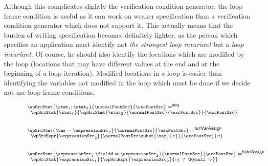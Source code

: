 Although this complicates slightly the verification condition generator, the loop frame condition is useful as it can work 
on weaker specification than a verification condition generator which does not support it. This actually means that the burden of writing specification 
becomes definitely lighter, as the person which specifies an application must identify not  \textit{the strongest loop invariant }
but a \textit{loop invariant}. Of course, he should also identify  the locations which are modified by the loop (locations that may have different values 
at the end and at the beginning of a loop iteration). Modified locations in a loop is easier than identifying the variables not modified in the loop which 
must be done if we decide not use loop frame conditions. 

\begin{figure}[ht!]
\begin{frameit}
$${\scriptsize 
        \begin{array}{l} 
	   \wpSrcStmt{ \stmt_1;\stmt_2}{\normalPostSrc }{ \excPostSrc } =^{\mbox{\rm\textsf{seq}}} \\
	   \begin{array}{l} 
             \wpSrcStmt{\stmt_1 }{\wpSrcStmt{\stmt_2 }{\normalPostSrc }{ \excPostSrc}} { \excPostSrc} 
           \end{array} \\ \\ \\
    \wpSrcStmt{ \var = \expressionSrc_2}{\normalPostSrc }{ \excPostSrc } =^{\mbox{\rm\textsf{locVarAssign}}} \\
                  \begin{array}{l}   \wpSrcExpr{\expressionSrc_2 }{ 
				    \normalPostSrc \subst{\var}{v}   
				   }{ \excPostSrc}{v}  
		  \end{array} \\ \\ \\
    \wpSrcStmt{ \expressionSrc_1.\fieldd = \expressionSrc_2}{\normalPostSrc }{ \excPostSrc } = ^{\mbox{\rm\textsf{fieldAssign}}}\\
               \begin{array}{l} 
	       \wpSrcStmt{\expressionSrc_1}{  %
		 \wpSrcExpr{\expressionSrc_2 }{ %
		    v_1 \neq \Mynull  \Rightarrow %
}}
\end{array}
\end{array}}$$
\end{frameit}
\end{figure}
